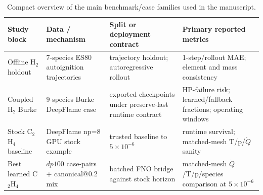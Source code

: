 \begin{table}[t]
\centering
\small
\caption{Compact overview of the main benchmark/case families used in the manuscript.}
\label{tab:experiment-overview}
\begin{tabular}{p{2.8cm}p{3.3cm}p{4.1cm}p{4.6cm}}
\toprule
Study block & Data / mechanism & Split or deployment contract & Primary reported metrics \\
\midrule
Offline H$_2$ holdout & 7-species ES80 autoignition trajectories & trajectory holdout; autoregressive rollout & 1-step/rollout MAE; element and mass consistency \\
Coupled H$_2$ Burke & 9-species Burke DeepFlame case & exported checkpoints under preserve-last runtime contract & HP-failure risk; learned/fallback fractions; operating windows \\
Stock C$_2$H$_4$ baseline & DeepFlame np=8 GPU stock example & trusted baseline to $5\times10^{-6}$ & runtime survival; matched-mesh T/p/$\dot{Q}$ sanity \\
Best learned C$_2$H$_4$ & $dp100$ case-pairs + canonical@0.2 mix & batched FNO bridge against stock horizon & matched-mesh $\dot{Q}$/T/p/species comparison at $5\times10^{-6}$ \\
\bottomrule
\end{tabular}
\end{table}
